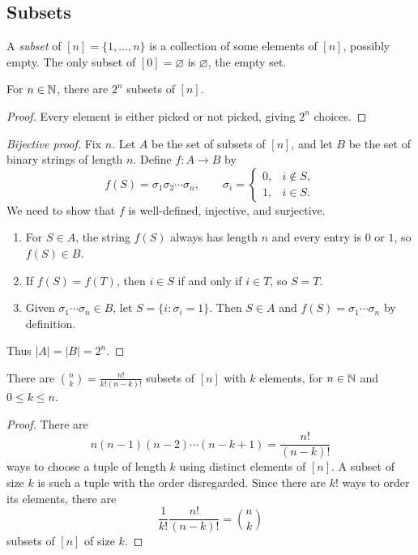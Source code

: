 \subsection{Subsets}
\begin{definition}
A \textit{subset} of $[n]=\{1,\ldots,n\}$ is a collection of some elements of $[n]$, possibly empty. The only subset of $[0]=\varnothing$ is $\varnothing$, the empty set.
\end{definition}
\begin{lemma}
For $n\in\mathbb{N}$, there are $2^n$ subsets of $[n]$.
\end{lemma}
\begin{proof}
Every element is either picked or not picked, giving $2^n$ choices.
\end{proof}
\begin{proof}[Bijective proof]
Fix $n$. Let $A$ be the set of subsets of $[n]$, and let $B$ be the set of binary strings of length $n$. Define $f\colon A\to B$ by
\[
f(S)=\sigma_1\sigma_2\cdots\sigma_n,
\qquad
\sigma_i=\begin{cases}0,&i\notin S,\\1,&i\in S.\end{cases}
\]
We need to show that $f$ is well-defined, injective, and surjective.
\begin{enumerate}
\item For $S\in A$, the string $f(S)$ always has length $n$ and every entry is $0$ or $1$, so $f(S)\in B$.
\item If $f(S)=f(T)$, then $i\in S$ if and only if $i\in T$, so $S=T$.
\item Given $\sigma_1\cdots\sigma_n\in B$, let $S=\{i:\sigma_i=1\}$. Then $S\in A$ and $f(S)=\sigma_1\cdots\sigma_n$ by definition.
\end{enumerate}
Thus $|A|=|B|=2^n$.
\end{proof}
\begin{lemma}
There are $\displaystyle\binom{n}{k}=\frac{n!}{k!(n-k)!}$ subsets of $[n]$ with $k$ elements, for $n\in\mathbb{N}$ and $0\le k\le n$.
\end{lemma}
\begin{proof}
There are
\[
n(n-1)(n-2)\cdots(n-k+1)=\frac{n!}{(n-k)!}
\]
ways to choose a tuple of length $k$ using distinct elements of $[n]$. A subset of size $k$ is such a tuple with the order disregarded. Since there are $k!$ ways to order its elements, there are
\[
\frac{1}{k!}\frac{n!}{(n-k)!}=\binom{n}{k}
\]
subsets of $[n]$ of size $k$.
\end{proof}

